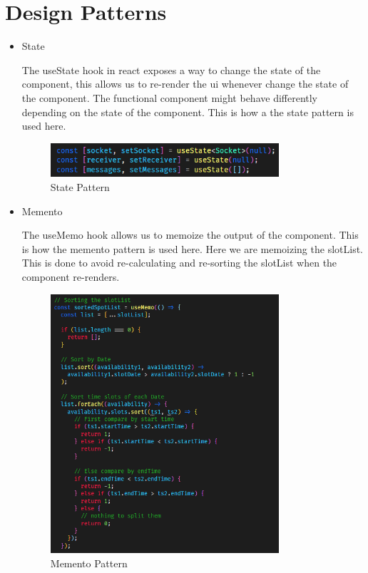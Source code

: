     \section{Design Patterns}
        \begin{itemize}
            \item{State}

            The useState hook in react exposes a way to change the state of the component, this allows us to re-render the ui whenever change the state of the component. The functional component might behave differently depending on the state of the component. This is how a the state pattern is used here.
            
            \begin{figure}[h]
                \centering
                \includegraphics[width=0.8\textwidth]{images/useState.png}
                \caption{State Pattern}
                \label{fig:state}
            \end{figure}

            \pagebreak

            \item{Memento}
            
            The useMemo hook allows us to memoize the output of the component. This is how the memento pattern is used here. Here we are memoizing the slotList. This is done to avoid re-calculating and re-sorting the slotList when the component re-renders.

            \begin{figure}[h]
                \centering
                \includegraphics[width=0.8\textwidth]{images/useMemo.png}
                \caption{Memento Pattern}
                \label{fig:memento}
            \end{figure}
            
        \end{itemize}

